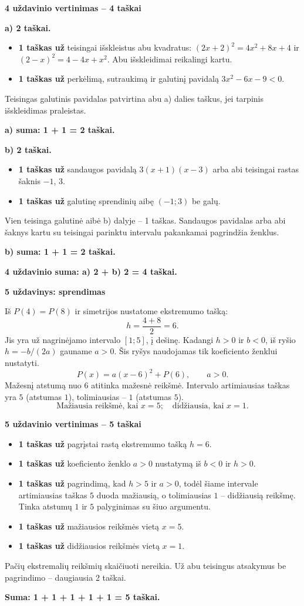 \documentclass[11pt]{article}
\newcommand{\sk}[1]{\par\medskip\textbf{#1}\par}
\begin{document}
\sk{4 uždavinio vertinimas -- 4 taškai}
\textbf{a) 2 taškai.}\begin{itemize}
\item \textbf{1 taškas už} teisingai išskleistus abu kvadratus: $(2x+2)^2=4x^2+8x+4$ ir $(2-x)^2=4-4x+x^2$. Abu išskleidimai reikalingi kartu.
\item \textbf{1 taškas už} perkėlimą, sutraukimą ir galutinį pavidalą $3 x^{2} - 6 x - 9<0$.
\end{itemize}
Teisingas galutinis pavidalas patvirtina abu a) dalies taškus, jei tarpinis išskleidimas praleistas.\par\textbf{a) suma: 1 + 1 = 2 taškai.}\par\textbf{b) 2 taškai.}\begin{itemize}
\item \textbf{1 taškas už} sandaugos pavidalą $3(x+1)(x-3)$ arba abi teisingai rastas šaknis $-1$, $3$.
\item \textbf{1 taškas už} galutinę sprendinių aibę $(-1;3)$ be galų.
\end{itemize}
Vien teisinga galutinė aibė b) dalyje -- 1 taškas. Sandaugos pavidalas arba abi šaknys kartu su teisingai parinktu intervalu pakankamai pagrindžia ženklus.\par\textbf{b) suma: 1 + 1 = 2 taškai.}\par\textbf{4 uždavinio suma: a) 2 + b) 2 = 4 taškai.}\newpage

\sk{5 uždavinys: sprendimas}
Iš $P(4)=P(8)$ ir simetrijos nustatome ekstremumo tašką:
\[h=\frac{4+8}2=6.\]
Jis yra už nagrinėjamo intervalo $[1;5]$, į dešinę. Kadangi $h>0$ ir $b<0$, iš ryšio $h=-b/(2a)$ gauname $a>0$. Šis ryšys naudojamas tik koeficiento ženklui nustatyti.
\[P(x)=a(x-6)^2+P(6),\qquad a>0.\]
Mažesnį atstumą nuo $6$ atitinka mažesnė reikšmė. Intervalo artimiausias taškas yra $5$ (atstumas $1$), tolimiausias -- $1$ (atstumas $5$).
\[\boxed{\text{Mažiausia reikšmė, kai }x=5;\quad\text{didžiausia, kai }x=1.}\]

\sk{5 uždavinio vertinimas -- 5 taškai}
\begin{itemize}
\item \textbf{1 taškas už} pagrįstai rastą ekstremumo tašką $h=6$.
\item \textbf{1 taškas už} koeficiento ženklo $a>0$ nustatymą iš $b<0$ ir $h>0$.
\item \textbf{1 taškas už} pagrindimą, kad $h>5$ ir $a>0$, todėl šiame intervale artimiausias taškas $5$ duoda mažiausią, o tolimiausias $1$ -- didžiausią reikšmę. Tinka atstumų $1$ ir $5$ palyginimas su šiuo argumentu.
\item \textbf{1 taškas už} mažiausios reikšmės vietą $x=5$.
\item \textbf{1 taškas už} didžiausios reikšmės vietą $x=1$.
\end{itemize}
Pačių ekstremalių reikšmių skaičiuoti nereikia. Už abu teisingus atsakymus be pagrindimo -- daugiausia 2 taškai.\par\textbf{Suma: 1 + 1 + 1 + 1 + 1 = 5 taškai.}
\end{document}
